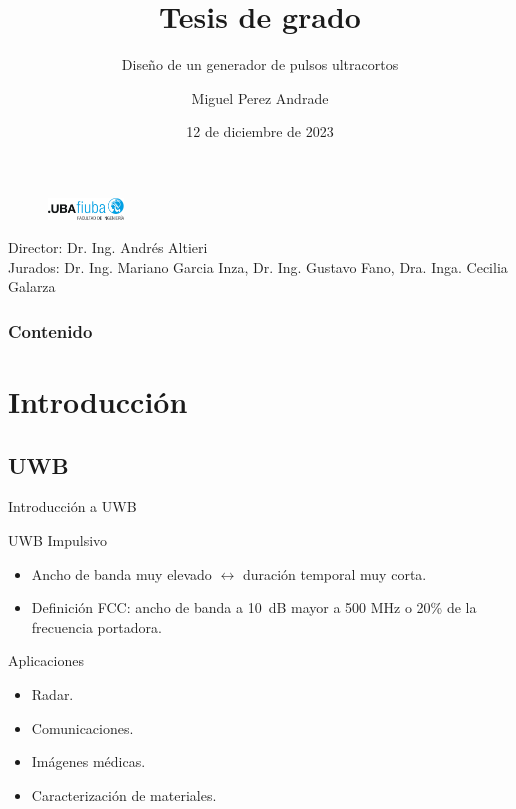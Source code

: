 \documentclass{beamer}
\author{Miguel Perez Andrade}
\title{Tesis de grado}
\subtitle{Diseño de un generador de pulsos ultracortos}
\date{12 de diciembre de 2023}
\institute{Facultad de Ingeniería de la Universidad de Buenos Aires}
\begin{document}
\begin{frame}
  \titlepage
  \begin{figure}
    \centering
    \includegraphics[width=2cm]{images/fiuba_logo.jpg}
  \end{figure}
  \begin{block}{}
    \centering
    \small Director: Dr. Ing. Andrés Altieri \\
    Jurados: Dr. Ing. Mariano Garcia Inza, Dr. Ing. Gustavo Fano, Dra. Inga.
      Cecilia Galarza
  \end{block}
\end{frame}

\begin{frame}
\frametitle{Contenido}
\tableofcontents
\end{frame}

\section{Introducción}

\subsection{UWB}


\begin{frame}{Introducción a UWB}
  \begin{block}{UWB Impulsivo}
    \begin{itemize}
      \item Ancho de banda muy elevado $\leftrightarrow$ duración temporal muy
          corta.
      \item Definición FCC: ancho de banda a \qty{10}{\dB} mayor a 500 MHz o 20\% de la frecuencia portadora.
    \end{itemize}
  \end{block}
  \begin{block}{Aplicaciones}
    \begin{itemize}
      \item Radar.
      \item Comunicaciones.
      \item Imágenes médicas.
      \item Caracterización de materiales.
    \end{itemize}
  \end{block}
\end{frame}
\end{document}

